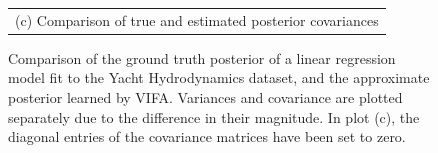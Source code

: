 \documentclass[msc,deptreport.inf]{infthesis} %
\begin{document}
\begin{figure}[!htbp]
\begin{tabular}{c}
		(c) Comparison of true and estimated posterior covariances \\[6pt] 
	\end{tabular}
	\caption{Comparison of the ground truth posterior of a linear regression model fit to the Yacht Hydrodynamics dataset, and the approximate posterior learned by VIFA. Variances and covariance are plotted separately due to the difference in their magnitude. In plot (c), the diagonal entries of the covariance matrices have been set to zero.}
	\label{fig:posterior_yacht_hydrodynamics}
\end{figure}




%
%
%
%
\end{document}
